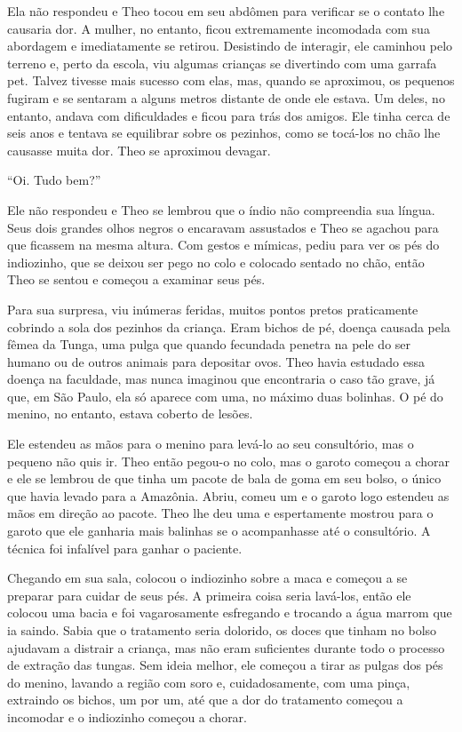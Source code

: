 Ela não respondeu e Theo tocou em seu abdômen para verificar se o
contato lhe causaria dor. A mulher, no entanto, ficou extremamente
incomodada com sua abordagem e imediatamente se retirou. Desistindo de
interagir, ele caminhou pelo terreno e, perto da escola, viu algumas
crianças se divertindo com uma garrafa pet. Talvez tivesse mais sucesso
com elas, mas, quando se aproximou, os pequenos fugiram e se sentaram a
alguns metros distante de onde ele estava. Um deles, no entanto, andava
com dificuldades e ficou para trás dos amigos. Ele tinha cerca de seis
anos e tentava se equilibrar sobre os pezinhos, como se tocá-los no chão
lhe causasse muita dor. Theo se aproximou devagar.

``Oi. Tudo bem?''

Ele não respondeu e Theo se lembrou que o índio não compreendia sua
língua. Seus dois grandes olhos negros o encaravam assustados e Theo se
agachou para que ficassem na mesma altura. Com gestos e mímicas, pediu
para ver os pés do indiozinho, que se deixou ser pego no colo e colocado
sentado no chão, então Theo se sentou e começou a examinar seus pés.

Para sua surpresa, viu inúmeras feridas, muitos pontos pretos
praticamente cobrindo a sola dos pezinhos da criança. Eram bichos de pé,
doença causada pela fêmea da Tunga, uma pulga que quando fecundada
penetra na pele do ser humano ou de outros animais para depositar ovos.
Theo havia estudado essa doença na faculdade, mas nunca imaginou que
encontraria o caso tão grave, já que, em São Paulo, ela só aparece com
uma, no máximo duas bolinhas. O pé do menino, no entanto, estava coberto
de lesões.

Ele estendeu as mãos para o menino para levá-lo ao seu consultório, mas
o pequeno não quis ir. Theo então pegou-o no colo, mas o garoto começou
a chorar e ele se lembrou de que tinha um pacote de bala de goma em seu
bolso, o único que havia levado para a Amazônia. Abriu, comeu um e o
garoto logo estendeu as mãos em direção ao pacote. Theo lhe deu uma e
espertamente mostrou para o garoto que ele ganharia mais balinhas se o
acompanhasse até o consultório. A técnica foi infalível para ganhar o
paciente.

Chegando em sua sala, colocou o indiozinho sobre a maca e começou a se
preparar para cuidar de seus pés. A primeira coisa seria lavá-los, então
ele colocou uma bacia e foi vagarosamente esfregando e trocando a água
marrom que ia saindo. Sabia que o tratamento seria dolorido, os doces
que tinham no bolso ajudavam a distrair a criança, mas não eram
suficientes durante todo o processo de extração das tungas. Sem ideia
melhor, ele começou a tirar as pulgas dos pés do menino, lavando a
região com soro e, cuidadosamente, com uma pinça, extraindo os bichos,
um por um, até que a dor do tratamento começou a incomodar e o
indiozinho começou a chorar.

